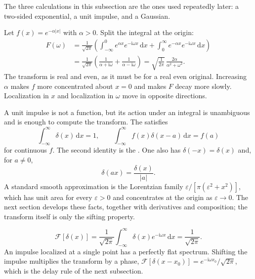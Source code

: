 The three calculations in this subsection are the ones used repeatedly later: a two-sided exponential, a unit impulse, and a Gaussian.

\begin{example}
Let $f(x)=e^{-\alpha|x|}$ with $\alpha>0$. Split the integral at the origin:
\begin{align}
F(\omega)
&=\frac{1}{\sqrt{2\pi}}
\left(
\int_{-\infty}^{0}e^{\alpha x}e^{-\mathrm{i}\omega x}\,\mathrm{d}x
+\int_0^{\infty}e^{-\alpha x}e^{-\mathrm{i}\omega x}\,\mathrm{d}x
\right)
\nonumber\\
&=\frac{1}{\sqrt{2\pi}}
\left(\frac{1}{\alpha+\mathrm{i}\omega}+\frac{1}{\alpha-\mathrm{i}\omega}\right)
=\sqrt{\frac{1}{2\pi}}\,\frac{2\alpha}{\alpha^2+\omega^2}.
\end{align}
The transform is real and even, as it must be for a real even original. Increasing $\alpha$ makes $f$ more concentrated about $x=0$ and makes $F$ decay more slowly. Localization in $x$ and localization in $\omega$ move in opposite directions.
\end{example}

A unit impulse is not a function, but its action under an integral is unambiguous and is enough to compute the transform. The  satisfies
\begin{equation}
\int_{-\infty}^{\infty}\delta(x)\,\mathrm{d}x=1,
\qquad
\int_{-\infty}^{\infty}f(x)\delta(x-a)\,\mathrm{d}x=f(a)
\end{equation}
for continuous $f$. The second identity is the . One also has $\delta(-x)=\delta(x)$ and, for $a\neq 0$,
\begin{equation}
\delta(ax)=\frac{\delta(x)}{|a|}.
\end{equation}
A standard smooth approximation is the Lorentzian family $\varepsilon/[\pi(\varepsilon^2+x^2)]$, which has unit area for every $\varepsilon>0$ and concentrates at the origin as $\varepsilon\to 0$. The next section develops these facts, together with derivatives and composition; the transform itself is only the sifting property.

\begin{example}
\begin{equation}
\mathcal{F}[\delta(x)]
=\frac{1}{\sqrt{2\pi}}\int_{-\infty}^{\infty}\delta(x)e^{-\mathrm{i}\omega x}\,\mathrm{d}x
=\frac{1}{\sqrt{2\pi}}.
\end{equation}
An impulse localized at a single point has a perfectly flat spectrum. Shifting the impulse multiplies the transform by a phase, $\mathcal{F}[\delta(x-x_0)]=e^{-\mathrm{i}\omega x_0}/\sqrt{2\pi}$, which is the delay rule of the next subsection.
\end{example}

